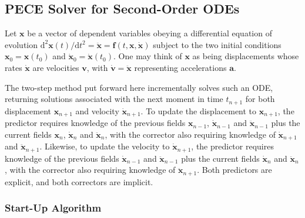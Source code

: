 \subsection{PECE Solver for Second-Order ODEs}
\label{sec:2ndOrderPECE}

Let $\mathbf{x}$ be a vector of dependent variables obeying a differential equation of evolution $\mathrm{d}^2 \mathbf{x}(t) / \mathrm{d} t^2 = \ddot{\mathbf{x}} = \mathbf{f} (t, \mathbf{x}, \dot{\mathbf{x}})$ subject to the two initial conditions $\mathbf{x}_0 = \mathbf{x}(t_0)$ and $\dot{\mathbf{x}}_0 = \dot{\mathbf{x}}(t_0)$.  One may think of $\mathbf{x}$ as being displacements whose rates $\dot{\mathbf{x}}$ are velocities $\mathbf{v}$, with $\dot{\mathbf{v}} = \ddot{\mathbf{x}}$ representing accelerations $\mathbf{a}$. 

The two-step method put forward here incrementally solves such an ODE, returning solutions associated with the next moment in time $t_{n+1}$ for both displacement $\mathbf{x}_{n+1}$ and velocity $\dot{\mathbf{x}}_{n+1}$.  To update the displacement to $\mathbf{x}_{n+1}$, the predictor requires knowledge of the previous fields $\mathbf{x}_{n-1}$, $\dot{\mathbf{x}}_{n-1}$ and $\ddot{\mathbf{x}}_{n-1}$ plus the current fields $\mathbf{x}_n$, $\dot{\mathbf{x}}_n$ and $\ddot{\mathbf{x}}_n$, with the corrector also requiring knowledge of $\dot{\mathbf{x}}_{n+1}$ and $\ddot{\mathbf{x}}_{n+1}$.  Likewise, to update the velocity to $\dot{\mathbf{x}}_{n+1}$, the predictor requires knowledge of the previous fields $\dot{\mathbf{x}}_{n-1}$ and $\ddot{\mathbf{x}}_{n-1}$ plus the current fields $\dot{\mathbf{x}}_n$ and $\ddot{\mathbf{x}}_n$, with the corrector also requiring knowledge of $\ddot{\mathbf{x}}_{n+1}$.  Both predictors are explicit, and both correctors are implicit.

\subsubsection{Start-Up Algorithm}

